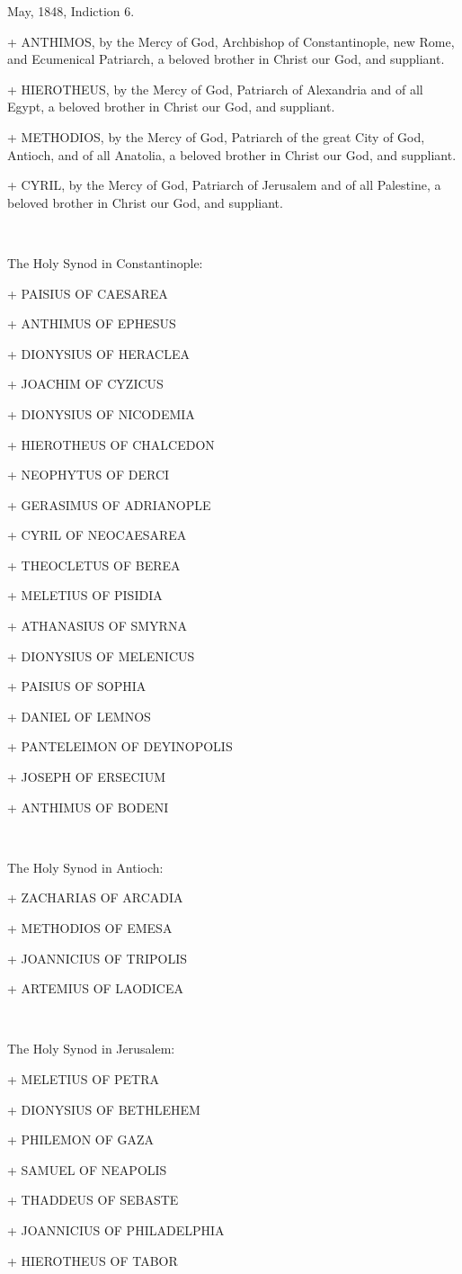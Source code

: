 May, 1848, Indiction 6.

+ ANTHIMOS, by the Mercy of God, Archbishop of Constantinople, new Rome,
and Ecumenical Patriarch, a beloved brother in Christ our God, and
suppliant.

+ HIEROTHEUS, by the Mercy of God, Patriarch of Alexandria and of all
Egypt, a beloved brother in Christ our God, and suppliant.

+ METHODIOS, by the Mercy of God, Patriarch of the great City of God,
Antioch, and of all Anatolia, a beloved brother in Christ our God, and
suppliant.

+ CYRIL, by the Mercy of God, Patriarch of Jerusalem and of all
Palestine, a beloved brother in Christ our God, and suppliant.

~

The Holy Synod in Constantinople:

+ PAISIUS OF CAESAREA

+ ANTHIMUS OF EPHESUS

+ DIONYSIUS OF HERACLEA

+ JOACHIM OF CYZICUS

+ DIONYSIUS OF NICODEMIA

+ HIEROTHEUS OF CHALCEDON

+ NEOPHYTUS OF DERCI

+ GERASIMUS OF ADRIANOPLE

+ CYRIL OF NEOCAESAREA

+ THEOCLETUS OF BEREA

+ MELETIUS OF PISIDIA

+ ATHANASIUS OF SMYRNA

+ DIONYSIUS OF MELENICUS

+ PAISIUS OF SOPHIA

+ DANIEL OF LEMNOS

+ PANTELEIMON OF DEYINOPOLIS

+ JOSEPH OF ERSECIUM

+ ANTHIMUS OF BODENI

~

The Holy Synod in Antioch:

+ ZACHARIAS OF ARCADIA

+ METHODIOS OF EMESA

+ JOANNICIUS OF TRIPOLIS

+ ARTEMIUS OF LAODICEA

~

The Holy Synod in Jerusalem:

+ MELETIUS OF PETRA

+ DIONYSIUS OF BETHLEHEM

+ PHILEMON OF GAZA

+ SAMUEL OF NEAPOLIS

+ THADDEUS OF SEBASTE

+ JOANNICIUS OF PHILADELPHIA

+ HIEROTHEUS OF TABOR

